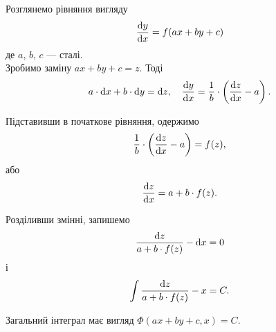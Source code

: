 Розглянемо рівняння вигляду
\begin{equation*}
	\frac{\mathop{}\!\mathrm{d} y}{\mathop{}\!\mathrm{d} x} = f(a x + b y + c)
\end{equation*}
де $a$, $b$, $c$ --- сталі. \\

Зробимо заміну $a x + b y + c = z$. Тоді 
\begin{equation*}
	a \cdot \mathop{}\!\mathrm{d} x + b \cdot \mathop{}\!\mathrm{d} y = \mathop{}\!\mathrm{d} z, \quad \frac{\mathop{}\!\mathrm{d} y}{\mathop{}\!\mathrm{d} x} = \frac1b \cdot \left( \frac{\mathop{}\!\mathrm{d} z}{\mathop{}\!\mathrm{d} x} - a \right).
\end{equation*}

Підставивши в початкове рівняння, одержимо
\begin{equation*}
	\frac1b \cdot \left( \frac{\mathop{}\!\mathrm{d} z}{\mathop{}\!\mathrm{d} x} - a \right) = f(z),
\end{equation*}
або
\begin{equation*}
	\frac{\mathop{}\!\mathrm{d} z}{\mathop{}\!\mathrm{d} x} = a + b \cdot f (z).
\end{equation*}

Розділивши змінні, запишемо
\begin{equation*}
	\frac{\mathop{}\!\mathrm{d} z}{a + b \cdot f (z)} - \mathop{}\!\mathrm{d} x = 0
\end{equation*}
і
\begin{equation*}
	\int \frac{\mathop{}\!\mathrm{d} z}{a + b \cdot f (z)} - x = C.
\end{equation*}

Загальний інтеграл має вигляд $\Phi(a x + b y + c, x) = C$.